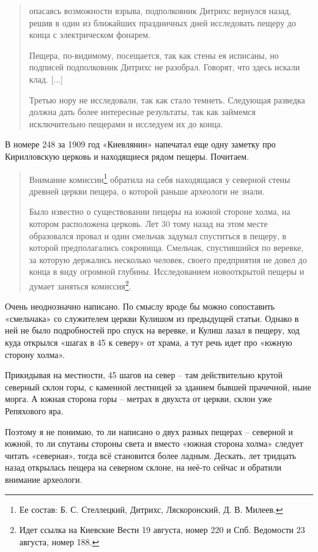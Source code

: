 \begin{quotation}
опасаясь возможности взрыва, подполковник Дитрихс вернулся назад, решив в один из ближайших праздничных дней исследовать пещеру до конца с электрическом фонарем.

Пещера, по-видимому, посещается, так как стены ея исписаны, но подписей подполковник Дитрихс не разобрал. Говорят, что здесь искали клад. [...]

Третью нору не исследовали, так как стало темнеть. Следующая разведка должна дать более интересные результаты, так как займемся исключительно пещерами и исследуем их до конца.
\end{quotation}

В номере 248 за 1909 год «Киевлянин» напечатал еще одну заметку про Кирилловскую церковь и находящиеся рядом пещеры. Почитаем.

\begin{quotation}
Внимание комиссии\footnote{Ее состав: Б. С. Стеллецкий, Дитрихс, Ляскоронский, Д. В. Милеев.} обратила на себя находящаяся у северной стены древней церкви пещера, о которой раньше археологи не знали. 

Было известно о существовании пещеры на южной стороне холма, на котором расположена церковь. Лет 30 тому назад на этом месте образовался провал и один смельчак задумал спуститься в пещеру, в которой предполагались сокровища. Смельчак, спустившийся по веревке, за которую держались несколько человек, своего предприятия не довел до конца в виду огромной глубины. Исследованием новооткрытой пещеры и думает заняться комиссия\footnote{Идет ссылка на Киевские Вести 19 августа, номер 220 и Спб. Ведомости 23 августа, номер 188.}.
\end{quotation}

Очень неоднозначно написано. По смыслу вроде бы можно сопоставить «смельчака» со служителем церкви Кулишом из предыдущей статьи. Однако в ней не было подробностей про спуск на веревке, и Кулиш лазал в пещеру, ход куда открылся «шагах в 45 к северу» от храма, а тут речь идет про «южную сторону холма».

Прикидывая на местности, 45 шагов на север – там действительно крутой северный склон горы, с каменной лестницей за зданием бывшей прачечной, ныне морга. А южная сторона горы – метрах в двухста от церкви, склон уже Репяхового яра.

Поэтому я не понимаю, то ли написано о двух разных пещерах – северной и южной, то ли спутаны стороны света и вместо «южная сторона холма» следует читать «северная», тогда всё становится более ладным. Дескать, лет тридцать назад открылась пещера на северном склоне, на неё-то сейчас и обратили внимание археологи. 

